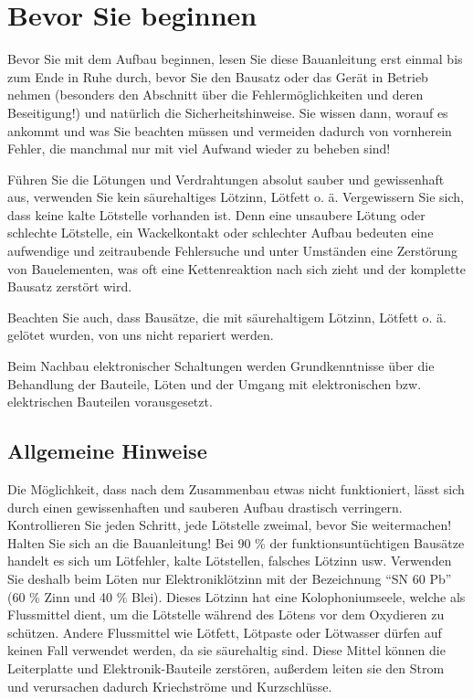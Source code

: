\documentclass[fleqn,10pt]{SelfArx} %
\begin{document}

\section{Bevor Sie beginnen}

Bevor Sie mit dem Aufbau beginnen, lesen Sie diese Bauanleitung erst einmal bis zum Ende in Ruhe durch, bevor Sie den Bausatz oder das Gerät in Betrieb nehmen (besonders den Abschnitt über die Fehlermöglichkeiten und deren Beseitigung!) und natürlich die Sicherheitshinweise. Sie wissen dann, worauf es ankommt und was Sie beachten müssen und vermeiden dadurch von vornherein Fehler, die manchmal nur mit viel Aufwand wieder zu beheben sind!

Führen Sie die Lötungen und Verdrahtungen absolut sauber und gewissenhaft aus, verwenden Sie kein säurehaltiges Lötzinn, Lötfett o. ä. Vergewissern Sie sich, dass keine kalte Lötstelle vorhanden ist. Denn eine unsaubere Lötung oder schlechte Lötstelle, ein Wackelkontakt oder schlechter Aufbau bedeuten eine aufwendige und zeitraubende Fehlersuche und unter Umständen eine Zerstörung von Bauelementen, was oft eine Kettenreaktion nach sich zieht und der komplette Bausatz zerstört wird.

Beachten Sie auch, dass Bausätze, die mit säurehaltigem Lötzinn, Lötfett o. ä. gelötet wurden, von uns nicht repariert werden.

Beim Nachbau elektronischer Schaltungen werden Grundkenntnisse über die Behandlung der Bauteile, Löten und der Umgang mit elektronischen bzw. elektrischen Bauteilen vorausgesetzt.

 \subsection*{Allgemeine Hinweise}

Die Möglichkeit, dass nach dem Zusammenbau etwas nicht funktioniert, lässt sich durch einen gewissenhaften und sauberen Aufbau drastisch verringern. Kontrollieren Sie jeden Schritt, jede Lötstelle zweimal, bevor Sie weitermachen! Halten Sie sich an die Bauanleitung! Bei 90 \% der funktionsuntüchtigen Bausätze handelt es sich um Lötfehler, kalte Lötstellen, falsches Lötzinn usw. Verwenden Sie deshalb beim Löten nur Elektroniklötzinn mit der Bezeichnung “SN 60 Pb” (60 \% Zinn und 40 \% Blei). Dieses Lötzinn hat eine Kolophoniumseele, welche als Flussmittel dient, um die Lötstelle während des Lötens vor dem Oxydieren zu schützen. Andere Flussmittel wie Lötfett, Lötpaste oder Lötwasser dürfen auf keinen Fall verwendet werden, da sie säurehaltig sind. Diese Mittel können die Leiterplatte und Elektronik-Bauteile zerstören, außerdem leiten sie den Strom und verursachen dadurch Kriechströme und Kurzschlüsse.
\end{document}
